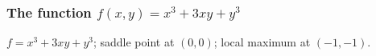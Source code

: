 \documentclass[9pt]{beamer}
\begin{document}
\begin{frame}[t]
 \frametitle{The function $f(x,y)=x^3+3xy+y^3$}
 $f=x^3+3xy+y^3$; saddle point at $(0,0)$; local maximum at
 $(-1,-1)$. 
\end{frame}
\end{document}
